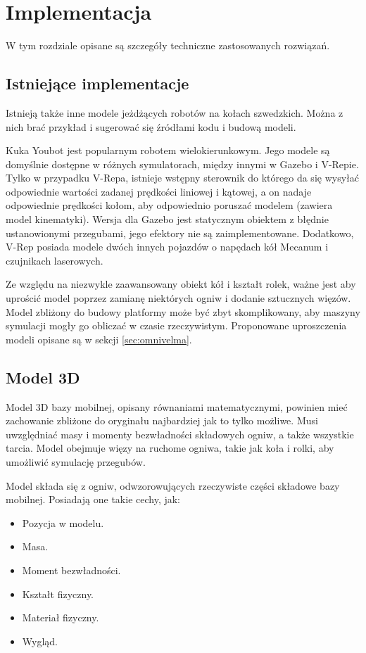 \chapter{Implementacja} 
\label{sec:implementation}
W tym rozdziale opisane są szczegóły techniczne zastosowanych rozwiązań.

\section{Istniejące implementacje}
	Istnieją także inne modele jeżdżących robotów na kołach szwedzkich.
	Można z nich brać przykład i sugerować się źródłami kodu i budową modeli.

	Kuka Youbot jest popularnym robotem wielokierunkowym. Jego modele są domyślnie dostępne w różnych symulatorach, między innymi w Gazebo i V-Repie. 
	Tylko w przypadku V-Repa, istnieje wstępny sterownik do którego da się wysyłać odpowiednie wartości zadanej prędkości liniowej i kątowej, a on nadaje odpowiednie prędkości kołom, aby odpowiednio poruszać modelem (zawiera model kinematyki).
	Wersja dla Gazebo jest statycznym obiektem z błędnie ustanowionymi przegubami, jego efektory nie są zaimplementowane.
	Dodatkowo, V-Rep posiada modele dwóch innych pojazdów o napędach kół Mecanum i czujnikach laserowych.

	Ze względu na niezwykle zaawansowany obiekt kół i kształt rolek, ważne jest aby uprościć model poprzez zamianę niektórych ogniw i dodanie sztucznych więzów.
	Model zbliżony do budowy platformy może być zbyt skomplikowany, aby maszyny symulacji mogły go obliczać w czasie rzeczywistym.
	Proponowane uproszczenia modeli opisane są w sekcji \ref{sec:omnivelma}.
	
\section{Model 3D}
	Model 3D bazy mobilnej, opisany równaniami matematycznymi, powinien mieć zachowanie zbliżone do oryginału najbardziej jak to tylko możliwe.
	Musi uwzględniać masy i momenty bezwładności składowych ogniw, a także wszystkie tarcia.
	Model obejmuje więzy na ruchome ogniwa, takie jak koła i rolki, aby umożliwić symulację przegubów.

	Model składa się z ogniw, odwzorowujących rzeczywiste części składowe bazy mobilnej.
	Posiadają one takie cechy, jak:
	\begin{itemize}
		\item Pozycja w modelu.
		\item Masa.
		\item Moment bezwładności.
		\item Kształt fizyczny.
		\item Materiał fizyczny.
		\item Wygląd.
	\end{itemize}


